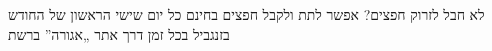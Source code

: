 \documentclass{minimal}
\begin{document}
לא חבל לזרוק חפצים?
אפשר לתת ולקבל
חפצים בחינם
כל יום שישי הראשון של החודש בזנגביל
בכל זמן דרך אתר „אגורה” ברשת
\end{document}
